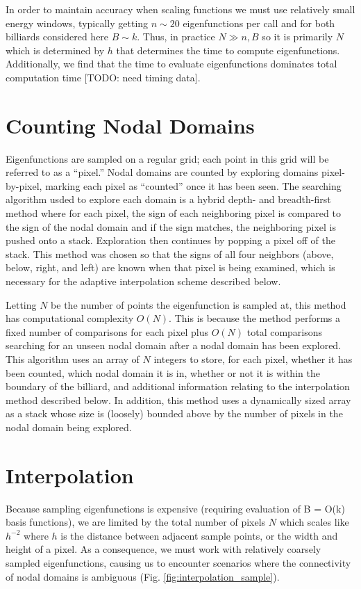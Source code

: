 \documentclass{report}
\begin{document}
In order to maintain accuracy when scaling functions we must use relatively small energy windows, typically getting $n \sim 20$ eigenfunctions per call and for both billiards considered here $B \sim k$. Thus, in practice $N \gg n, B$ so it is primarily $N$ which is determined by $h$ that determines the time to compute eigenfunctions. Additionally, we find that the time to evaluate eigenfunctions dominates total computation time [TODO: need timing data].

\section{Counting Nodal Domains}
Eigenfunctions are sampled on a regular grid; each point in this grid will be referred to as a ``pixel.'' Nodal domains are counted by exploring domains pixel-by-pixel, marking each pixel as ``counted'' once it has been seen. The searching algorithm usded to explore each domain is a hybrid depth- and breadth-first method where for each pixel, the sign of each neighboring pixel is compared to the sign of the nodal domain and if the sign matches, the neighboring pixel is pushed onto a stack. Exploration then continues by popping a pixel off of the stack. This method was chosen so that the signs of all four neighbors (above, below, right, and left) are known when that pixel is being examined, which is necessary for the adaptive interpolation scheme described below.

Letting $N$ be the number of points the eigenfunction is sampled at, this method has computational complexity $O(N)$. This is because the method performs a fixed number of comparisons for each pixel plus $O(N)$ total comparisons searching for an unseen nodal domain after a nodal domain has been explored. This algorithm uses an array of $N$ integers to store, for each pixel, whether it has been counted, which nodal domain it is in, whether or not it is within the boundary of the billiard, and additional information relating to the interpolation method described below. In addition, this method uses a dynamically sized array as a stack whose size is (loosely) bounded above by the number of pixels in the nodal domain being explored.

\section{Interpolation}
Because sampling eigenfunctions is expensive (requiring evaluation of B = O(k) basis functions), we are limited by the total number of pixels $N$ which scales like $h^{-2}$ where $h$ is the distance between adjacent sample points, or the width and height of a pixel. As a consequence, we must work with relatively coarsely sampled eigenfunctions, causing us to encounter scenarios where the connectivity of nodal domains is ambiguous (Fig. \ref{fig:interpolation_sample}).
\end{document}
